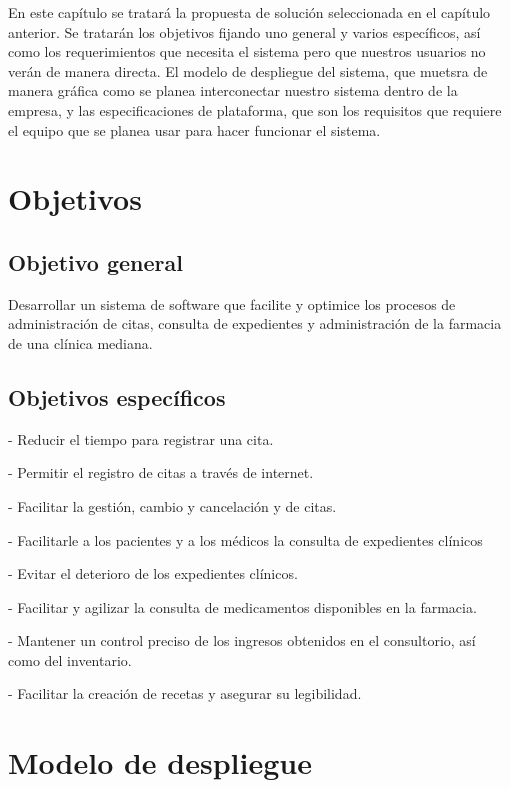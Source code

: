 En este capítulo se tratará la propuesta de solución seleccionada en el capítulo anterior. Se tratarán los objetivos fijando uno general y varios específicos, así como los requerimientos que necesita el sistema pero que nuestros usuarios no verán de manera directa. El modelo de despliegue del sistema, que muetsra de manera gráfica como se planea interconectar nuestro sistema dentro de la empresa, y las especificaciones de plataforma, que son los requisitos que requiere el equipo que se planea usar para hacer funcionar el sistema.

\section{Objetivos}

\subsection{Objetivo general}

Desarrollar un sistema de software que facilite y optimice los procesos de administraci\'on de citas, consulta de expedientes y administraci\'on de la farmacia de una cl\'inica mediana.

\subsection{Objetivos específicos}

- Reducir el tiempo para registrar una cita.

- Permitir el registro de citas a través de internet.

- Facilitar la gestión, cambio y cancelación y de citas.

- Facilitarle a los pacientes y a los médicos la consulta de expedientes clínicos

- Evitar el deterioro de los expedientes clínicos.

- Facilitar y agilizar la consulta de medicamentos disponibles en la farmacia.

- Mantener un control preciso de los ingresos obtenidos en el consultorio, así como del inventario.

- Facilitar la creación de recetas y asegurar su legibilidad.

\section{Modelo de despliegue}


